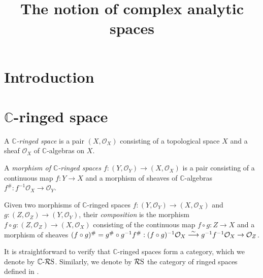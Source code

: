 






\title{The notion of complex analytic spaces}







\maketitle


\tableofcontents



\section{Introduction}

\section{\texorpdfstring{$\mathbb{C}$}{C}-ringed space}

\begin{definition}
    A \emph{$\mathbb{C}$-ringed space} is a pair $(X,\mathcal{O}_X)$ consisting of a topological space $X$ and a sheaf $\mathcal{O}_X$ of $\mathbb{C}$-algebras on $X$.

    A \emph{morphism of $\mathbb{C}$-ringed spaces $f:(Y,\mathcal{O}_Y)\rightarrow (X,\mathcal{O}_X)$} is a pair consisting of a continuous map $f:Y\rightarrow X$ and a morphism of sheaves of $\mathbb{C}$-algebras $f^{\#}:f^{-1}\mathcal{O}_X\rightarrow \mathcal{O}_Y$.

    Given two morphisms of $\mathbb{C}$-ringed spaces $f:(Y,\mathcal{O}_Y)\rightarrow (X,\mathcal{O}_X)$ and $g:(Z,\mathcal{O}_Z)\rightarrow (Y,\mathcal{O}_Y)$, their \emph{composition} is the morphism $f\circ g:(Z,\mathcal{O}_Z)\rightarrow (X,\mathcal{O}_X)$ consisting of the continuous map $f\circ g:Z\rightarrow X$ and a morphism of sheaves $(f\circ g)^{\#}=g^{\#}\circ g^{-1}f^{\#}:(f\circ g)^{-1}\mathcal{O}_X\stackrel{\sim}{\longrightarrow} g^{-1}f^{-1}\mathcal{O}_X\rightarrow \mathcal{O}_Z$.
\end{definition}
It is straightforward to verify that $\mathbb{C}$-ringed spaces form a category, which we denote by $\mathbb{C}\text{-}\mathcal{R}\mathrm{S}$. Similarly, we denote by $\mathcal{R}\mathrm{S}$ the category of ringed spaces defined in \cite[\href{https://stacks.math.columbia.edu/tag/0090}{Tag 0090}]{stacks-project}.

